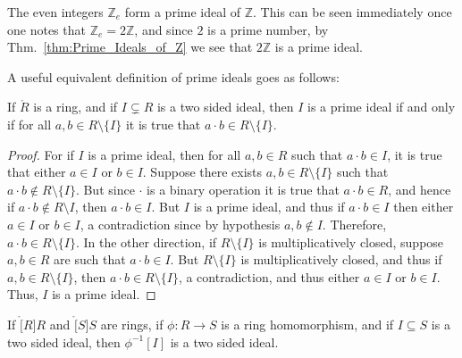    \begin{example}
        The even integers $\mathbb{Z}_{e}$ form a prime ideal of
        $\mathbb{Z}$. This can be seen immediately once one notes that
        $\mathbb{Z}_{e}=2\mathbb{Z}$, and since $2$ is a prime number,
        by Thm.~\ref{thm:Prime_Ideals_of_Z} we see that $2\mathbb{Z}$ is a
        prime ideal.
    \end{example}
    A useful equivalent definition of prime ideals goes as follows:
    \begin{theorem}
        If $\ring{R}$ is a ring, and if $I\subsetneq{R}$ is a two sided
        ideal, then $I$ is a prime ideal if and only if for all
        $a,b\in{R}\setminus\{I\}$ it is true that
        $a\cdot{b}\in{R}\setminus\{I\}$.
    \end{theorem}
    \begin{proof}
        For if $I$ is a prime ideal, then for all $a,b\in{R}$ such that
        $a\cdot{b}\in{I}$, it is true that either $a\in{I}$ or $b\in{I}$.
        Suppose there exists $a,b\in{R}\setminus\{I\}$ such that
        $a\cdot{b}\notin{R}\setminus\{I\}$. But since $\cdot$ is a binary
        operation it is true that $a\cdot{b}\in{R}$, and hence if
        $a\cdot{b}\notin{R}\setminus{I}$, then $a\cdot{b}\in{I}$. But $I$ is
        a prime ideal, and thus if $a\cdot{b}\in{I}$ then either $a\in{I}$
        or $b\in{I}$, a contradiction since by hypothesis $a,b\notin{I}$.
        Therefore, $a\cdot{b}\in{R}\setminus\{I\}$. In the other direction,
        if $R\setminus\{I\}$ is multiplicatively closed, suppose $a,b\in{R}$
        are such that $a\cdot{b}\in{I}$. But $R\setminus\{I\}$ is
        multiplicatively closed, and thus if $a,b\in{R}\setminus\{I\}$, then
        $a\cdot{b}\in{R}\setminus\{I\}$, a contradiction, and thus either
        $a\in{I}$ or $b\in{I}$. Thus, $I$ is a prime ideal.
    \end{proof}
    \begin{theorem}
        \label{thm:homo_pre_image_of_ideal_is_ideal}%
        If $\ring[R]{R}$ and $\ring[S]{S}$ are rings, if
        $\phi:R\rightarrow{S}$ is a ring homomorphism, and if
        $I\subseteq{S}$ is a two sided ideal, then $\phi^{\minus{1}}[I]$ is
        a two sided ideal.
    \end{theorem}
